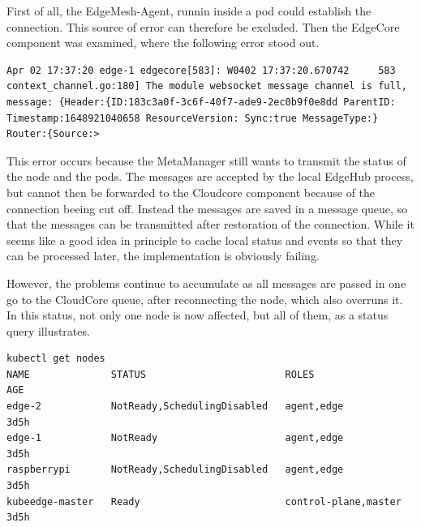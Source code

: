 \documentclass[MSC,Master,english]{twbook}%
\begin{document}
First of all, the EdgeMesh-Agent, runnin inside a pod could establish the connection. This source of error can therefore be excluded. Then the EdgeCore component was examined, where the following error stood out.

\vspace{\baselineskip}
\begin{minipage}{\linewidth}
    \begin{lstlisting}[caption={EdgeCore Error},captionpos=b]
Apr 02 17:37:20 edge-1 edgecore[583]: W0402 17:37:20.670742     583 context_channel.go:180] The module websocket message channel is full, message: {Header:{ID:183c3a0f-3c6f-40f7-ade9-2ec0b9f0e8dd ParentID: Timestamp:1648921040658 ResourceVersion: Sync:true MessageType:} Router:{Source:>
    \end{lstlisting}
\end{minipage}

This error occurs because the MetaManager still wants to transmit the status of the node and the pods. The messages are accepted by the local EdgeHub process, but cannot then be forwarded to the Cloudcore component because of the connection beeing cut off. Instead the messages are saved in a message queue, so that the messages can be transmitted after restoration of the connection. While it seems like a good idea in principle to cache local status and events so that they can be processed later, the implementation is obviously failing. \par

However, the problems continue to accumulate as all messages are passed in one go to the CloudCore queue, after reconnecting the node, which also overruns it. In this status, not only one node is now affected, but all of them, as a status query illustrates.

\begin{lstlisting}[caption={EdgeCore nodes unavailable},captionpos=b]
kubectl get nodes
NAME              STATUS                        ROLES                  AGE
edge-2            NotReady,SchedulingDisabled   agent,edge             3d5h
edge-1            NotReady                      agent,edge             3d5h
raspberrypi       NotReady,SchedulingDisabled   agent,edge             3d5h
kubeedge-master   Ready                         control-plane,master   3d5h
\end{lstlisting}
\end{document}
